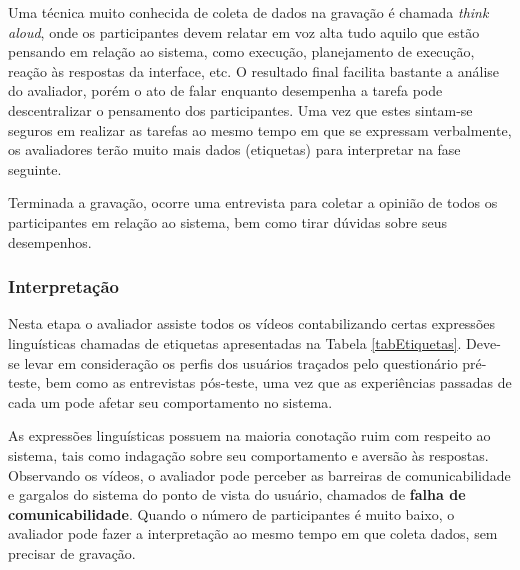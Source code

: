 \indent Uma técnica muito conhecida de coleta de dados na gravação é chamada \textit{think aloud}, onde os participantes devem relatar em voz alta tudo aquilo que estão pensando em relação ao sistema, como execução, planejamento de execução, reação às respostas da interface, etc. O resultado final facilita bastante a análise do avaliador, porém o ato de falar enquanto desempenha a tarefa pode descentralizar o pensamento dos participantes. Uma vez que estes sintam-se seguros em realizar as tarefas ao mesmo tempo em que se expressam verbalmente, os avaliadores terão muito mais dados (etiquetas) para interpretar na fase seguinte.

\indent Terminada a gravação, ocorre uma entrevista para coletar a opinião de todos os participantes em relação ao sistema, bem como tirar dúvidas sobre seus desempenhos.

\subsubsection{Interpretação}

\indent Nesta etapa o avaliador assiste todos os vídeos contabilizando certas expressões linguísticas chamadas de etiquetas apresentadas na Tabela \ref{tabEtiquetas}. Deve-se levar em consideração os perfis dos usuários traçados pelo questionário pré-teste, bem como as entrevistas pós-teste, uma vez que as experiências passadas de cada um pode afetar seu comportamento no sistema. 

\indent As expressões linguísticas possuem na maioria conotação ruim com respeito ao sistema, tais como indagação sobre seu comportamento e aversão às respostas. Observando os vídeos, o avaliador pode perceber as barreiras de comunicabilidade e gargalos do sistema do ponto de vista do usuário, chamados de \textbf{falha de comunicabilidade}. Quando o número de participantes é muito baixo, o avaliador pode fazer a interpretação ao mesmo tempo em que coleta dados, sem precisar de gravação.

